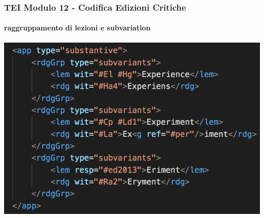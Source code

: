 \begin{frame}
    \frametitle{TEI Modulo 12 - Codifica Edizioni Critiche}
    \framesubtitle{raggruppamento di lezioni e subvariation}
    \addtocounter{nframe}{1}
    





    

    \begin{center}
        \includegraphics[width=.95\textwidth]{imgs/variant-subvariant.png}
    \end{center}


\end{frame}



